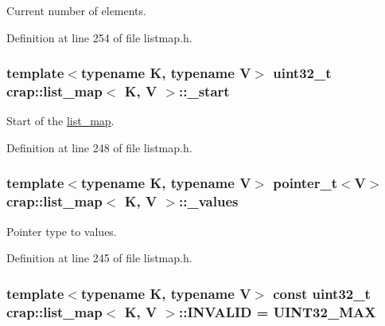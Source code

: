 Current number of elements. 



Definition at line 254 of file listmap.\+h.

\hypertarget{classcrap_1_1list__map_aff95986154fe7aa854edf0973e477f82}{
\subsubsection[{\+\_\+start}]{\setlength{\rightskip}{0pt plus 5cm}template$<$typename K, typename V$>$ uint32\+\_\+t {\bf crap\+::list\+\_\+map}$<$ K, V $>$\+::\+\_\+start\hspace{0.3cm}{\ttfamily [protected]}}}\label{classcrap_1_1list__map_aff95986154fe7aa854edf0973e477f82}


Start of the \hyperlink{classcrap_1_1list__map}{list\+\_\+map}. 



Definition at line 248 of file listmap.\+h.

\hypertarget{classcrap_1_1list__map_acba7dbe40068c27c619e0f44235125c9}{
\subsubsection[{\+\_\+values}]{\setlength{\rightskip}{0pt plus 5cm}template$<$typename K, typename V$>$ {\bf pointer\+\_\+t}$<$V$>$ {\bf crap\+::list\+\_\+map}$<$ K, V $>$\+::\+\_\+values\hspace{0.3cm}{\ttfamily [protected]}}}\label{classcrap_1_1list__map_acba7dbe40068c27c619e0f44235125c9}


Pointer type to values. 



Definition at line 245 of file listmap.\+h.

\hypertarget{classcrap_1_1list__map_a313f6d46ae51b1bcd274860ee7e8c2a0}{
\subsubsection[{I\+N\+V\+A\+L\+I\+D}]{\setlength{\rightskip}{0pt plus 5cm}template$<$typename K, typename V$>$ const uint32\+\_\+t {\bf crap\+::list\+\_\+map}$<$ K, V $>$\+::I\+N\+V\+A\+L\+I\+D = {\bf U\+I\+N\+T32\+\_\+\+M\+A\+X}\hspace{0.3cm}{\ttfamily [static]}}}\label{classcrap_1_1list__map_a313f6d46ae51b1bcd274860ee7e8c2a0}


